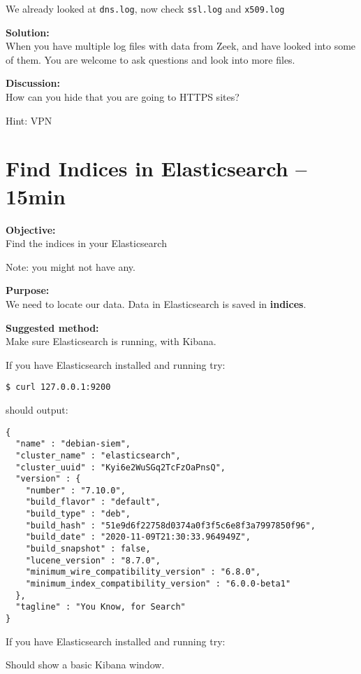 \documentclass[a4paper,11pt,notitlepage]{report}
\begin{document}
We already looked at \verb+dns.log+, now check \verb+ssl.log+ and \verb+x509.log+

{\bf Solution:}\\
When you have multiple log files with data from Zeek, and have looked into some of them. You are welcome to ask questions and look into more files.


{\bf Discussion:}\\
How can you hide that you are going to HTTPS sites?

Hint: VPN




\chapter{Find Indices in Elasticsearch -- 15min}
\label{ex:es-find-indices}

{\bf Objective:}\\
Find the indices in your Elasticsearch

Note: you might not have any.

{\bf Purpose:}\\
We need to locate our data. Data in Elasticsearch is saved in {\bf indices}.


{\bf Suggested method:}\\
Make sure Elasticsearch is running, with Kibana.

If you have Elasticsearch installed and running try: 

\begin{verbatim}
$ curl 127.0.0.1:9200
\end{verbatim}
should output:
\begin{verbatim}
{
  "name" : "debian-siem",
  "cluster_name" : "elasticsearch",
  "cluster_uuid" : "Kyi6e2WuSGq2TcFzOaPnsQ",
  "version" : {
    "number" : "7.10.0",
    "build_flavor" : "default",
    "build_type" : "deb",
    "build_hash" : "51e9d6f22758d0374a0f3f5c6e8f3a7997850f96",
    "build_date" : "2020-11-09T21:30:33.964949Z",
    "build_snapshot" : false,
    "lucene_version" : "8.7.0",
    "minimum_wire_compatibility_version" : "6.8.0",
    "minimum_index_compatibility_version" : "6.0.0-beta1"
  },
  "tagline" : "You Know, for Search"
}
\end{verbatim}


If you have Elasticsearch installed and running try: 

Should show a basic Kibana window.
\end{document}
